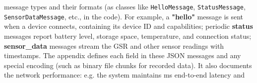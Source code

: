 message types and their formats (as classes like \texttt{HelloMessage}, \texttt{StatusMessage}, \texttt{SensorDataMessage}, etc., in the code). For example, a \textbf{"hello"} message is sent when a device connects, containing its device ID and capabilities; periodic \textbf{status} messages report battery level, storage space, temperature, and connection status; \textbf{sensor_data} messages stream the GSR and other sensor readings with timestamps. The appendix defines each field in these JSON messages and any special encoding (such as binary file chunks for recorded data). It also documents the network performance: e.g. the system maintains  ms end-to-end latency and %
